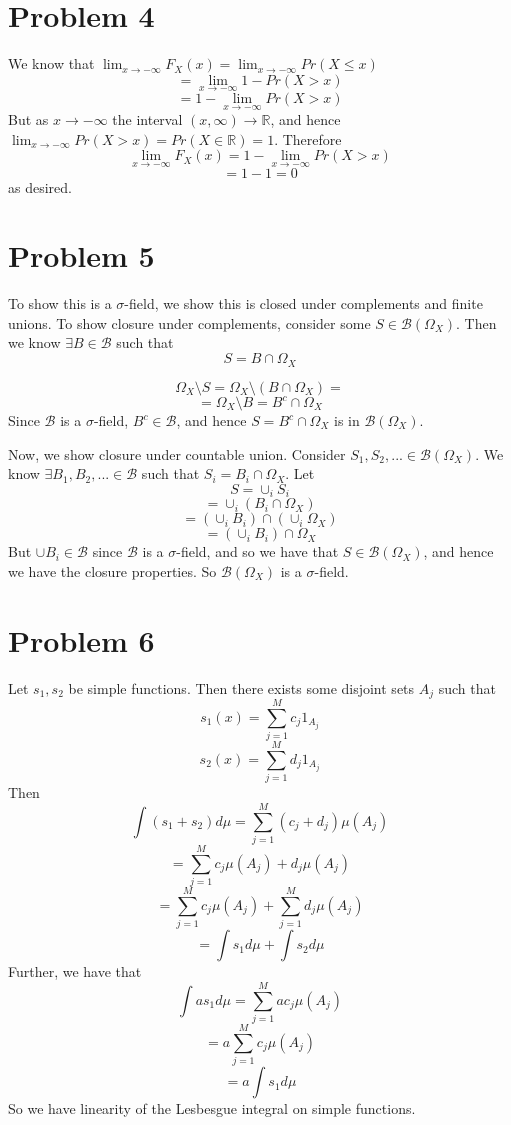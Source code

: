 \documentclass[10pt,letter]{article}
\begin{document}
\section*{Problem 4}
We know that
$\lim_{x \to -\infty} F_X(x) = \lim_{x \to -\infty} Pr(X \le x) $
\[ = \lim_{x \to -\infty} 1 - Pr(X > x) \]
\[ = 1 - \lim_{x \to -\infty} Pr(X > x) \]
But as $x \to -\infty$ the interval $(x, \infty) \to \mathbb{R}$, and hence $\lim_{x \to -\infty} Pr(X > x) = Pr(X \in \mathbb{R}) = 1$. Therefore
\[\lim_{x \to -\infty} F_X(x) = 1 - \lim_{x \to -\infty} Pr(X > x) \]
\[ = 1 - 1 = 0 \]
as desired.
\section*{Problem 5}
To show this is a $\sigma$-field, we show this is closed under complements and finite unions. To show closure under complements, consider some $S \in \mathcal{B}(\Omega_X)$. Then we know $\exists B \in \mathcal{B}$ such that
\[ S = B \cap \Omega_X \]

\[ \Omega_X\setminus S = \Omega_X \setminus (B \cap \Omega_X) = \]
\[ = \Omega_X \setminus B = B^c \cap \Omega_X \]
Since $\mathcal{B}$ is a $\sigma$-field, $B^c \in \mathcal{B}$, and hence $S = B^c \cap \Omega_X$ is in $\mathcal{B}(\Omega_X)$.

Now, we show closure under countable union. Consider $S_1, S_2, ... \in \mathcal{B}(\Omega_X)$. We know $\exists B_1, B_2, ... \in \mathcal{B}$ such that $S_i = B_i \cap \Omega_X$. Let
\[S = \cup_i S_i \]
\[ = \cup_i (B_i \cap \Omega_X) \]
\[ = (\cup_i B_i ) \cap (\cup_i \Omega_X) \]
\[ = (\cup_i B_i ) \cap\Omega_X  \]
But $\cup B_i \in \mathcal{B}$ since $\mathcal{B}$ is a $\sigma$-field, and so we have that $S \in \mathcal{B}(\Omega_X)$, and hence we have the closure properties. So $\mathcal{B}(\Omega_X)$ is a $\sigma$-field.

\section*{Problem 6}
Let $s_1, s_2$ be simple functions. Then there exists some disjoint sets $A_j$ such that
\[ s_1(x) = \sum_{j=1}^M c_j 1_{A_j} \]
\[ s_2(x) = \sum_{j=1}^M d_j 1_{A_j} \]
Then
\[ \int (s_1 + s_2) d\mu = \sum_{j=1}^M (c_j + d_j) \mu(A_j) \]
\[ = \sum_{j=1}^M c_j \mu(A_j)+ d_j \mu(A_j)  \]
\[ = \sum_{j=1}^M c_j \mu(A_j)+ \sum_{j=1}^Md_j \mu(A_j)  \]
\[ = \int s_1 d\mu + \int s_2 d\mu \]
Further, we have that
\[ \int as_1 d\mu = \sum_{j=1}^M ac_j \mu(A_j) \]
\[ = a \sum_{j=1}^M c_j \mu(A_j) \]
\[ = a \int s_1 d\mu \]
So we have linearity of the Lesbesgue integral on simple functions.
\end{document}
